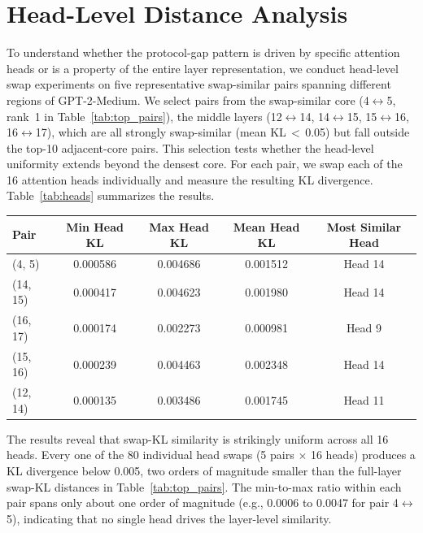\documentclass{article}
\newenvironment{tabhere}{%
  \par\medskip
  \begin{center}
}{%
  \end{center}
  \medskip
}
\begin{document}
\section{Head-Level Distance Analysis}
\label{sec:exp_head}
\label{sec:app_head}

To understand whether the protocol-gap pattern is driven by specific attention heads or is a property of the entire layer representation, we conduct head-level swap experiments on five representative swap-similar pairs spanning different regions of GPT-2-Medium. We select pairs from the swap-similar core (4$\leftrightarrow$5, rank~1 in Table~\ref{tab:top_pairs}), the middle layers (12$\leftrightarrow$14, 14$\leftrightarrow$15, 15$\leftrightarrow$16, 16$\leftrightarrow$17), which are all strongly swap-similar (mean KL$\,{<}\,$0.05) but fall outside the top-10 adjacent-core pairs. This selection tests whether the head-level uniformity extends beyond the densest core. For each pair, we swap each of the 16 attention heads individually and measure the resulting KL divergence. Table~\ref{tab:heads} summarizes the results.

\begin{tabhere}
\begin{tabular}{lcccc}
\toprule
Pair & Min Head KL & Max Head KL & Mean Head KL & Most Similar Head \\
\midrule
(4, 5) & 0.000586 & 0.004686 & 0.001512 & Head 14 \\
(14, 15) & 0.000417 & 0.004623 & 0.001980 & Head 14 \\
(16, 17) & 0.000174 & 0.002273 & 0.000981 & Head 9 \\
(15, 16) & 0.000239 & 0.004463 & 0.002348 & Head 14 \\
(12, 14) & 0.000135 & 0.003486 & 0.001745 & Head 11 \\
\bottomrule
\end{tabular}
\label{tab:heads}
\end{tabhere}


The results reveal that swap-KL similarity is strikingly uniform across all 16 heads. Every one of the 80 individual head swaps (5 pairs $\times$ 16 heads) produces a KL divergence below 0.005, two orders of magnitude smaller than the full-layer swap-KL distances in Table~\ref{tab:top_pairs}. The min-to-max ratio within each pair spans only about one order of magnitude (e.g., 0.0006 to 0.0047 for pair 4$\leftrightarrow$5), indicating that no single head drives the layer-level similarity.
\end{document}
